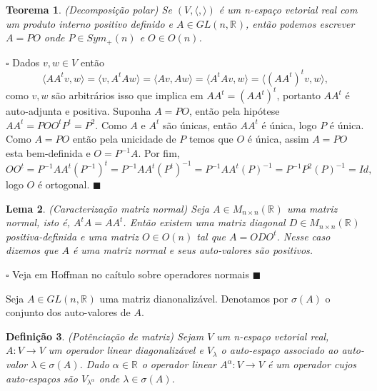 \documentclass[12pt]{book}
\newtheorem{teorema}{Teorema}[section]
\newtheorem{lema}[teorema]{Lema}
\newtheorem{definicao}[teorema]{Definição}
\newenvironment{prova}[1]{$\square$ #1}{\hfill$\blacksquare$}
\newcommand{\generalgroup}[2]{GL(#1, #2)}
\newcommand{\generalgroupreal}[1]{\generalgroup{#1}{\real{}}}
\newcommand{\matrizortogonal}[1]{O(#1)}
\newcommand{\matrizquadreal}[1]{M_{#1 \times #1}(\real{})}
\newcommand{\matrizsimetricapositiva}[1]{Sym_{+}(#1)}
\newcommand{\produtointerno}[2]{\langle #1, #2 \rangle}
\newcommand{\real}[1]{\mathbb{R}^{#1}}
\newcommand{\vermelho}[1]{{\color{red}#1}}
\begin{document}
	\begin{teorema}\label{teorema_decomposicao_polar}
		(Decomposição polar) Se $(V, \produtointerno{}{})$ é um n-espaço vetorial real com um produto interno positivo definido e $A \in \generalgroupreal{n}$, então podemos escrever $A=PO$ onde $P \in  \matrizsimetricapositiva{n}$ e $O \in \matrizortogonal{n}$.
	\end{teorema}
	\begin{prova}
		Dados $v,w \in V$ então 
		$$
		\produtointerno{AA^{t}v}{w}=\produtointerno{v}{A^{t}Aw}=\produtointerno{Av}{Aw}=\produtointerno{A^{t}Av}{w}=\produtointerno{(AA^{t})^{t} v}{w},
		$$
		como $v,w $ são arbitrários isso que implica em $AA^{t}=(AA^{t})^{t}$, portanto $AA^{t}$ é auto-adjunta e positiva. Suponha $A=PO$, então pela hipótese $AA^{t} = POO^{t}P^{t} = P^{2}$. Como $A$ e $A^{t}$ são únicas, então $AA^{t}$ é única, logo $P$ é única. Como $A=PO$ então pela unicidade de $P$ temos que $O$ é única, assim $A=PO$ esta bem-definida e $O=P^{-1}A$. Por fim, 
		$$
		OO^{t} = P^{-1}AA^{t}(P^{-1})^{t}= P^{-1}AA^{t}(P^{t})^{-1}=P^{-1}AA^{t}(P)^{-1}=P^{-1}P^{2}(P)^{-1}=Id,
		$$
		logo $O$ é ortogonal.
	\end{prova}
	
	\begin{lema}\label{lema_caracterizacao_matriz_normal}
		(Caracterização matriz normal) Seja $A\in \matrizquadreal{n}$ uma matriz normal, isto é, $A^{t}A=AA^{t}$. Então existem uma matriz diagonal $D \in \matrizquadreal{n}$ positiva-definida e uma matriz $O\in \matrizortogonal{n}$ tal que $A=ODO^{t}$. Nesse caso dizemos que $A$ é uma matriz normal e seus auto-valores são positivos. 
	\end{lema}
	\begin{prova}
		\vermelho{Veja em Hoffman no caítulo sobre operadores normais}
	\end{prova}

	Seja $A \in \generalgroupreal{n}$ uma matriz dianonalizável. Denotamos por $\sigma(A)$ o conjunto dos auto-valores de $A$.

	\begin{definicao}\label{definicao_potenciacao_matriz}
		(Potênciação de matriz) Sejam $V$ um n-espaço vetorial real, $A:V \to V$ um operador linear diagonalizável e $V_{\lambda}$ o auto-espaço associado ao auto-valor $\lambda \in \sigma(A)$. Dado $\alpha \in \real{}$ o operador linear $A^{\alpha}:V \to V$ é um operador cujos auto-espaços são $V_{\lambda^{\alpha}}$ onde $\lambda \in \sigma(A)$.
	\end{definicao}
	
\end{document}
